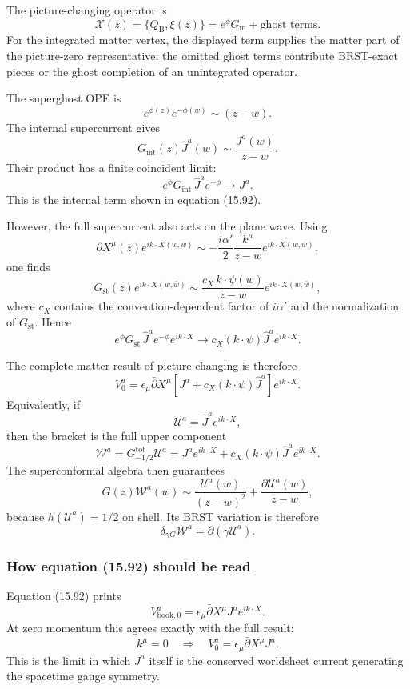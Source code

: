 \documentclass[
  10pt,
  a4paper,
  openany]{book}
\begin{document}
The picture-changing operator is \[
\mathcal X(z)
=
\{Q_{\mathrm B},\xi(z)\}
=
e^\phi G_{\mathrm m}
+\text{ghost terms}.
\] For the integrated matter vertex, the displayed term supplies the
matter part of the picture-zero representative; the omitted ghost terms
contribute BRST-exact pieces or the ghost completion of an unintegrated
operator.

The superghost OPE is \[
e^{\phi(z)}e^{-\phi(w)}
\sim
(z-w).
\] The internal supercurrent gives \[
G_{\mathrm{int}}(z)\hat J^a(w)
\sim
\frac{J^a(w)}{z-w}.
\] Their product has a finite coincident limit: \[
e^\phi G_{\mathrm{int}}\,
\hat J^a e^{-\phi}
\longrightarrow
J^a.
\] This is the internal term shown in equation (15.92).

However, the full supercurrent also acts on the plane wave. Using \[
\partial X^\mu(z)e^{ik\cdot X(w,\bar w)}
\sim
-\frac{i\alpha'}2
\frac{k^\mu}{z-w}
e^{ik\cdot X(w,\bar w)},
\] one finds \[
G_{\mathrm{st}}(z)e^{ik\cdot X(w,\bar w)}
\sim
\frac{c_X\,k\cdot\psi(w)}{z-w}
e^{ik\cdot X(w,\bar w)},
\] where \(c_X\) contains the convention-dependent factor of
\(i\alpha'\) and the normalization of \(G_{\mathrm{st}}\). Hence \[
e^\phi G_{\mathrm{st}}\,
\hat J^a e^{-\phi}e^{ik\cdot X}
\longrightarrow
c_X(k\cdot\psi)\hat J^a e^{ik\cdot X}.
\]

The complete matter result of picture changing is therefore \[
\boxed{
V_0^a
=
\epsilon_\mu\bar\partial X^\mu
\left[
J^a+c_X(k\cdot\psi)\hat J^a
\right]
e^{ik\cdot X}.
}
\] Equivalently, if \[
\mathcal U^a
=
\hat J^a e^{ik\cdot X},
\] then the bracket is the full upper component \[
\boxed{
\mathcal W^a
=
G_{-1/2}^{\mathrm{tot}}\mathcal U^a
=
J^a e^{ik\cdot X}
+
c_X(k\cdot\psi)\hat J^a e^{ik\cdot X}.
}
\] The superconformal algebra then guarantees \[
G(z)\mathcal W^a(w)
\sim
\frac{\mathcal U^a(w)}{(z-w)^2}
+
\frac{\partial\mathcal U^a(w)}{z-w},
\] because \(h(\mathcal U^a)=1/2\) on shell. Its BRST variation is
therefore \[
\delta_{\gamma G}\mathcal W^a
=
\partial(\gamma\mathcal U^a).
\]

\subsubsection{How equation (15.92) should be
read}\label{how-equation-15.92-should-be-read}

Equation (15.92) prints \[
V_{\mathrm{book},0}^a
=
\epsilon_\mu\bar\partial X^\mu
J^a e^{ik\cdot X}.
\] At zero momentum this agrees exactly with the full result: \[
k^\mu=0
\quad\Longrightarrow\quad
V_0^a
=
\epsilon_\mu\bar\partial X^\mu J^a.
\] This is the limit in which \(J^a\) itself is the conserved worldsheet
current generating the spacetime gauge symmetry.
\end{document}
